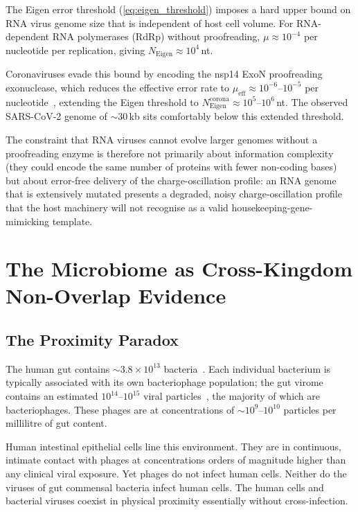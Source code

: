 \documentclass[12pt,a4paper]{article}
\theoremstyle{definition}
\theoremstyle{remark}
\begin{document}
The Eigen error threshold (\cref{eq:eigen_threshold}) imposes a hard upper bound on RNA virus genome size that is independent of host cell volume. For RNA-dependent RNA polymerases (RdRp) without proofreading, $\mu \approx 10^{-4}$ per nucleotide per replication, giving $N_{\mathrm{Eigen}} \approx 10^4$\,nt.

Coronaviruses evade this bound by encoding the nsp14 ExoN proofreading exonuclease, which reduces the effective error rate to $\mu_{\mathrm{eff}} \approx 10^{-6}$--$10^{-5}$ per nucleotide~\cite{Denison2011}, extending the Eigen threshold to $N_{\mathrm{Eigen}}^{\mathrm{corona}} \approx 10^5$--$10^6$\,nt. The observed SARS-CoV-2 genome of $\sim\!30$\,kb sits comfortably below this extended threshold.

The constraint that RNA viruses cannot evolve larger genomes without a proofreading enzyme is therefore not primarily about information complexity (they could encode the same number of proteins with fewer non-coding bases) but about error-free delivery of the charge-oscillation profile: an RNA genome that is extensively mutated presents a degraded, noisy charge-oscillation profile that the host machinery will not recognise as a valid housekeeping-gene-mimicking template.

\section{The Microbiome as Cross-Kingdom Non-Overlap Evidence}
\label{sec:microbiome}

\subsection{The Proximity Paradox}

The human gut contains $\sim\!3.8 \times 10^{13}$ bacteria~\cite{Sender2016}. Each individual bacterium is typically associated with its own bacteriophage population; the gut virome contains an estimated $10^{14}$--$10^{15}$ viral particles~\cite{Reyes2010,Virgin2014,Minot2011}, the majority of which are bacteriophages. These phages are at concentrations of $\sim\!10^9$--$10^{10}$ particles per millilitre of gut content.

Human intestinal epithelial cells line this environment. They are in continuous, intimate contact with phages at concentrations orders of magnitude higher than any clinical viral exposure. Yet phages do not infect human cells. Neither do the viruses of gut commensal bacteria infect human cells. The human cells and bacterial viruses coexist in physical proximity essentially without cross-infection.
\end{document}
